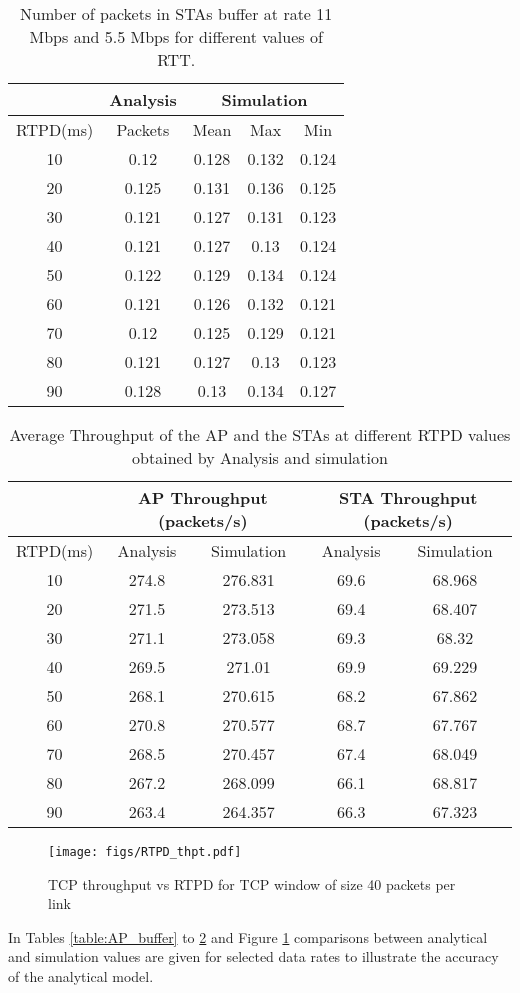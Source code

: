 \documentclass[conference]{IEEEtran}
\begin{document}
\begin{table}[ht]
\fontsize{8}{8} \selectfont
\centering \begin{tabular}{|c|c|c|c|c|}
\hline
& Analysis & \multicolumn{3}{|c|}{Simulation} \\ \hline
RTPD(ms) & Packets &	Mean 	&	Max 	&	Min \\ 
\hline
10	&	0.12		&	0.128	&	0.132	&	0.124	\\
20	&	0.125	&	0.131	&	0.136	&	0.125	\\
30	&	0.121	&	0.127	&	0.131	&	0.123	\\
40	&	0.121	&	0.127	&	0.13	&	0.124	\\
50	&	0.122	&	0.129	&	0.134	&	0.124	\\
60	&	0.121	&	0.126	&	0.132	&	0.121	\\
70	&	0.12		&	0.125	&	0.129	&	0.121	\\
80	&	0.121	&	0.127	&	0.13	&	0.123	\\
90	&	0.128	&	0.13	&	0.134	&	0.127	\\
\hline \end{tabular}
\caption{Number of packets in STAs buffer at rate 11 Mbps and 5.5 Mbps for different values of RTT.} 
\label{table:STA_buffer} \end{table}
\begin{table}[h]
\fontsize{8}{8} \selectfont
\centering \begin{tabular}{|c|c|c|c|c|}
\hline
& \multicolumn{2}{|c|}{AP Throughput (packets/s) } & \multicolumn{2}{|c|}{STA Throughput (packets/s)} \\ \hline
RTPD(ms) & Analysis &	Simulation  & Analysis &	Simulation \\
\hline
10	&	274.8	&	276.831	&	69.6	&	68.968	\\
20	&	271.5	&	273.513	&	69.4	&	68.407	\\
30	&	271.1	&	273.058	&	69.3	&	68.32	\\
40	&	269.5	&	271.01	&	69.9	&	69.229	\\
50	&	268.1	&	270.615	&	68.2	&	67.862	\\
60	&	270.8	&	270.577	&	68.7	&	67.767	\\
70	&	268.5	&	270.457	&	67.4	&	68.049	\\
80	&	267.2	&	268.099	&	66.1	&	68.817	\\
90	&	263.4	&	264.357	&	66.3	&	67.323	\\ \hline 
\end{tabular}
\caption{Average Throughput of the AP and the STAs at different RTPD values obtained by Analysis and simulation } 
\label{table:AP_STA_thpt} \end{table}
\begin{figure}
\centering
\texttt{[image: figs/RTPD\_thpt.pdf]} 
\caption{TCP throughput vs RTPD for TCP window of size 40 packets per link}
\label{fig:thpt}
\end{figure} 
 In Tables \ref{table:AP_buffer} to \ref{table:AP_STA_thpt} and Figure \ref{fig:thpt} comparisons between analytical and simulation values are given for selected data rates to illustrate the accuracy of the analytical model.
\end{document}

